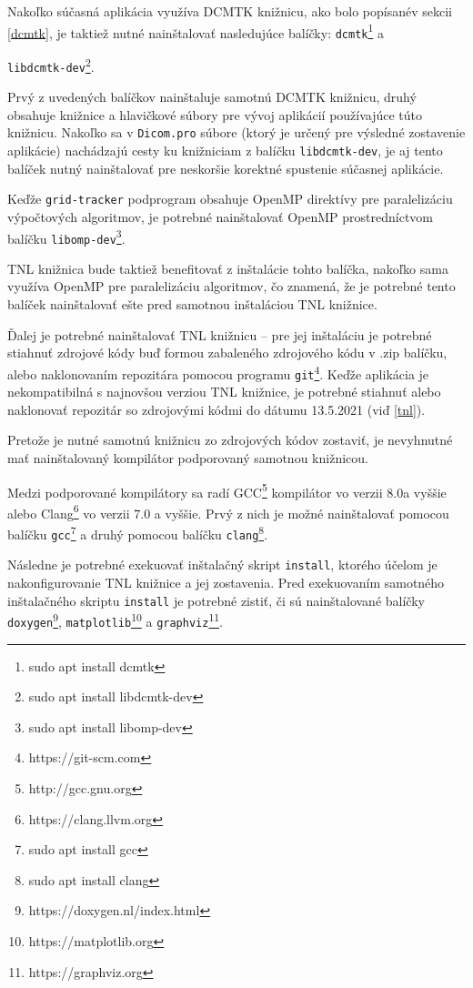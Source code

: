 Nakoľko súčasná aplikácia využíva DCMTK knižnicu, ako bolo popísané\newline v sekcii \ref{dcmtk}, je taktiež nutné nainštalovať nasledujúce balíčky: \texttt{dcmtk}\footnote{sudo apt install dcmtk} \newline a {\texttt{libdcmtk-dev}\footnote{sudo apt install libdcmtk-dev}.

Prvý z uvedených balíčkov nainštaluje samotnú DCMTK knižnicu, druhý obsahuje knižnice a hlavičkové súbory pre vývoj aplikácií používajúce túto knižnicu. Nakoľko sa v \texttt{Dicom.pro} súbore (ktorý je určený pre výsledné zostavenie aplikácie) nachádzajú cesty ku knižniciam z balíčku \texttt{libdcmtk-dev}, je aj tento balíček nutný nainštalovať pre neskoršie korektné spustenie súčasnej aplikácie.

Keďže \texttt{grid-tracker} podprogram obsahuje OpenMP direktívy pre paralelizáciu výpočtových algoritmov, je potrebné nainštalovať OpenMP prostredníctvom balíčku \texttt{libomp-dev}\footnote{sudo apt install libomp-dev}.

\clearpage
TNL knižnica bude taktiež benefitovať z inštalácie tohto balíčka, nakoľko sama využíva OpenMP pre paralelizáciu algoritmov, čo znamená, že je potrebné tento balíček nainštalovať ešte pred samotnou inštaláciou TNL knižnice.

Ďalej je potrebné nainštalovať TNL knižnicu -- pre jej inštaláciu je potrebné stiahnuť zdrojové kódy buď formou zabaleného zdrojového kódu v .zip balíčku, alebo naklonovaním repozitára pomocou programu \texttt{git}\footnote{https://git-scm.com}. Keďže aplikácia je nekompatibilná s najnovšou verziou TNL knižnice, je potrebné stiahnuť alebo naklonovať repozitár so zdrojovými kódmi do dátumu 13.5.2021 (viď \ref{tnl}).

Pretože je nutné samotnú knižnicu zo zdrojových kódov zostaviť, je nevyhnutné mať nainštalovaný kompilátor podporovaný samotnou knižnicou.

Medzi podporované kompilátory sa radí GCC\footnote{http://gcc.gnu.org} kompilátor vo verzii 8.0\newline a vyššie alebo Clang\footnote{https://clang.llvm.org} vo verzii 7.0 a vyššie. Prvý z nich je možné nainštalovať pomocou balíčku \texttt{gcc}\footnote{sudo apt install gcc} a druhý pomocou balíčku \texttt{clang}\footnote{sudo apt install clang}.

Následne je potrebné exekuovať inštalačný skript \texttt{install}, ktorého účelom je nakonfigurovanie TNL knižnice a jej zostavenia.
Pred exekuovaním samotného inštalačného skriptu \texttt{install} je potrebné zistiť, či sú nainštalované balíčky \texttt{doxygen}\footnote{https://doxygen.nl/index.html}, \texttt{matplotlib}\footnote{https://matplotlib.org} a \texttt{graphviz}\footnote{https://graphviz.org}.

}
